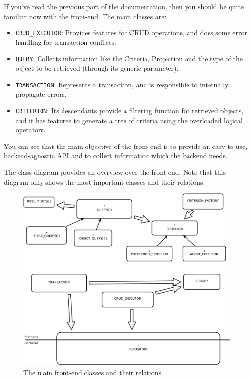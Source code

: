 \documentclass[a4paper,12pt]{report}
\begin{document}
If you've read the previous part of the documentation, then you should be quite familiar now with the front-end.
The main classes are:
 \begin{itemize}
  \item \lstinline!CRUD_EXECUTOR!: Provides features for CRUD operations, and does some error handling for transaction conflicts.
  \item \lstinline!QUERY!: Collects information like the Criteria, Projection and the type of the object to be retrieved (through its generic parameter).
  \item \lstinline!TRANSACTION!: Represents a transaction, and is responsible to internally propagate errors.
  \item \lstinline!CRITERION!: Its descendants provide a filtering function for retrieved objects, and it has features to generate a tree of criteria using the overloaded logical operators.
 \end{itemize}

You can see that the main objective of the front-end is to provide an easy to use, backend-agnostic API and to collect information which the backend needs.

The class diagram provides an overview over the front-end.
Note that this diagram only shows the most important classes and their relations.

\begin{figure} [h]
\centering
\includegraphics[trim= 0mm -10mm 0mm -10mm,clip, width = 13cm] {../includes/frontend.png}
\caption{The main front-end classes and their relations.}
\label{fig:front-end_classes}
\end{figure}
\end{document}

